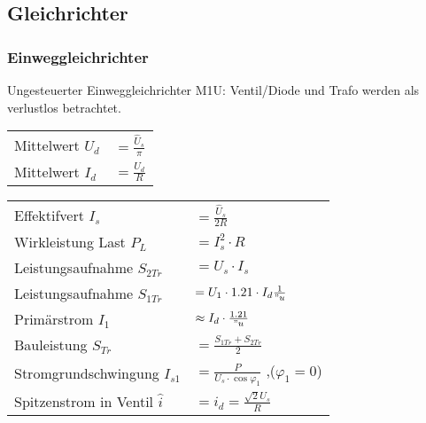 \subsection{Gleichrichter}
\begin{multicols}{2}
\subsubsection{Einweggleichrichter}
Ungesteuerter Einweggleichrichter M1U: \newline
Ventil/Diode und Trafo werden als verlustlos betrachtet.

\renewcommand{\arraystretch}{1.3}
\begin{tabular}{ll}
	Mittelwert $U_d$ 				& $ = \frac{\hat{U}_s}{\pi}$ \\
	Mittelwert $I_d$ 				& $ = \frac{U_d}{R}$ \\
\end{tabular}

\begin{tabular}{ll}
	Effektifvert $I_s$				& $ = \frac{\hat{U}_s}{2R}$ \\
	Wirkleistung Last $P_L$			& $ = I_s^2 \cdot R$ \\
	Leistungsaufnahme $S_{2Tr}$		& $ = U_s \cdot I_s$ \\
	Leistungsaufnahme $S_{1Tr}$		& $ = U_1 \cdot 1.21 \cdot I_d \frac{1}{"u}$ \\
	Primärstrom $I_1$				& $ \approx I_d \cdot \frac{1.21}{"u} $ \\
	Bauleistung $S_{Tr}$			& $ = \frac{S_{1Tr} + S_{2Tr}}{2}$ \\
	Stromgrundschwingung $I_{s1}$	& $ = \frac{P}{U_s \cdot \cos\varphi_1}$ ,($\varphi_1 = 0$) \\
	Spitzenstrom in Ventil $\hat{i}$& $ = \hat{i}_d = \frac{\sqrt{2} U_s}{R}$ \\
\end{tabular}
\end{multicols}

